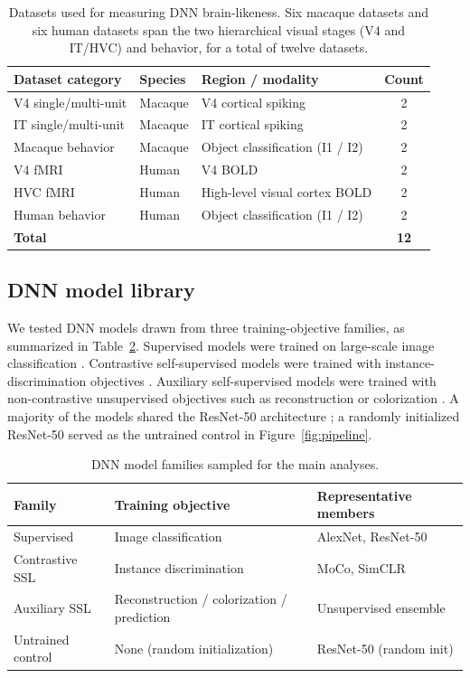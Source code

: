 \documentclass[11pt]{article}
\begin{document}
\begin{table}[htbp]
\centering
\caption{Datasets used for measuring DNN brain-likeness. Six macaque
datasets and six human datasets span the two hierarchical visual stages
(V4 and IT/HVC) and behavior, for a total of twelve datasets.}
\label{tab:datasets}
\begin{tabular}{lllc}
\toprule
Dataset category & Species & Region / modality & Count \\
\midrule
V4 single/multi-unit & Macaque & V4 cortical spiking & 2 \\
IT single/multi-unit & Macaque & IT cortical spiking & 2 \\
Macaque behavior & Macaque & Object classification (I1 / I2) & 2 \\
V4 fMRI & Human & V4 BOLD & 2 \\
HVC fMRI & Human & High-level visual cortex BOLD & 2 \\
Human behavior & Human & Object classification (I1 / I2) & 2 \\
\midrule
\textbf{Total} & & & \textbf{12} \\
\bottomrule
\end{tabular}
\end{table}

\subsection{DNN model library}

We tested DNN models drawn from three training-objective families, as
summarized in Table~\ref{tab:dnns}. Supervised models were trained on
large-scale image classification \citep{krizhevsky2012imagenet, he2016deep}.
Contrastive self-supervised models were trained with instance-discrimination
objectives \citep{chen2020simple, he2020momentum}. Auxiliary self-supervised
models were trained with non-contrastive unsupervised objectives such as
reconstruction or colorization \citep{zhuang2021unsupervised}. A majority of
the models shared the ResNet-50 architecture \citep{he2016deep}; a randomly
initialized ResNet-50 served as the untrained control in
Figure~\ref{fig:pipeline}.

\begin{table}[htbp]
\centering
\caption{DNN model families sampled for the main analyses.}
\label{tab:dnns}
\begin{tabular}{lll}
\toprule
Family & Training objective & Representative members \\
\midrule
Supervised & Image classification & AlexNet, ResNet-50 \\
Contrastive SSL & Instance discrimination & MoCo, SimCLR \\
Auxiliary SSL & Reconstruction / colorization / prediction & Unsupervised ensemble \\
Untrained control & None (random initialization) & ResNet-50 (random init) \\
\bottomrule
\end{tabular}
\end{table}
\end{document}
